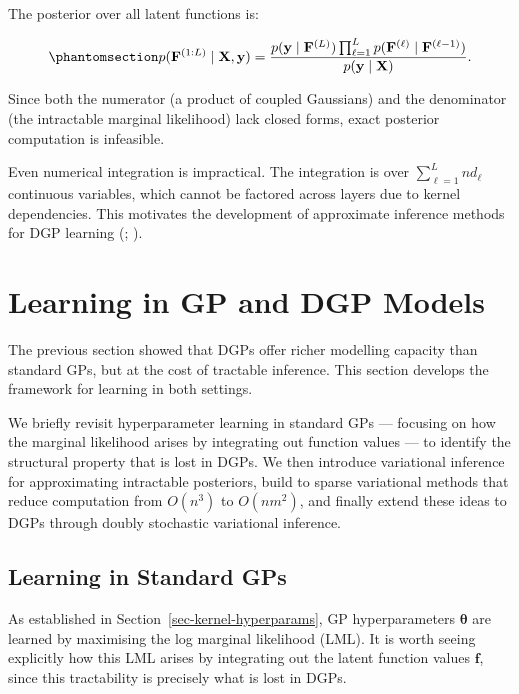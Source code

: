 \documentclass[
  letterpaper,
  DIV=11,
  numbers=noendperiod]{scrartcl}
\begin{document}
The posterior over all latent functions is:

\begin{equation}\phantomsection\label{eq-dgp_posterior}{
p(\mathbf{F}^{(1:L)} \mid \mathbf{X}, \mathbf{y}) = \frac{p(\mathbf{y} \mid \mathbf{F}^{(L)}) \prod_{\ell=1}^{L} p(\mathbf{F}^{(\ell)} \mid \mathbf{F}^{(\ell-1)})}{p(\mathbf{y} \mid \mathbf{X})}.
}\end{equation}

Since both the numerator (a product of coupled Gaussians) and the
denominator (the intractable marginal likelihood) lack closed forms,
exact posterior computation is infeasible.

Even numerical integration is impractical. The integration is over
\(\sum_{\ell=1}^{L} n d_\ell\) continuous variables, which cannot be
factored across layers due to kernel dependencies. This motivates the
development of approximate inference methods for DGP learning
(;
).

\section{Learning in GP and DGP Models}\label{sec-learning}

The previous section showed that DGPs offer richer modelling capacity
than standard GPs, but at the cost of tractable inference. This section
develops the framework for learning in both settings.

We briefly revisit hyperparameter learning in standard GPs --- focusing
on how the marginal likelihood arises by integrating out function values
--- to identify the structural property that is lost in DGPs. We then
introduce variational inference for approximating intractable
posteriors, build to sparse variational methods that reduce computation
from \(O(n^3)\) to \(O(nm^2)\), and finally extend these ideas to DGPs
through doubly stochastic variational inference.

\subsection{Learning in Standard GPs}\label{learning-in-standard-gps}

As established in Section~\ref{sec-kernel-hyperparams}, GP
hyperparameters \(\boldsymbol{\theta}\) are learned by maximising the
log marginal likelihood (LML). It is worth seeing explicitly how this
LML arises by integrating out the latent function values \(\mathbf{f}\),
since this tractability is precisely what is lost in DGPs.
\end{document}
